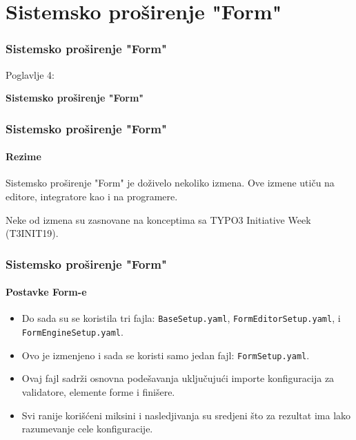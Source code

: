 %

\section{Sistemsko proširenje "Form"}
\begin{frame}[fragile]
	\frametitle{Sistemsko proširenje "Form"}

	\begin{center}\huge{Poglavlje 4:}\end{center}
	\begin{center}\huge{\color{typo3darkgrey}\textbf{Sistemsko proširenje "Form"}}\end{center}

\end{frame}


\begin{frame}[fragile]
	\frametitle{Sistemsko proširenje "Form"}
	\framesubtitle{Rezime}

	\small
		Sistemsko proširenje "Form" je doživelo nekoliko izmena.
		Ove izmene utiču na editore, integratore kao i na programere.

		\vspace{0.2cm}

		Neke od izmena su zasnovane na konceptima sa TYPO3 Initiative Week (T3INIT19).

	\normalsize

\end{frame}


\begin{frame}[fragile]
	\frametitle{Sistemsko proširenje "Form"}
	\framesubtitle{Postavke Form-e}

	\begin{itemize}
		\item Do sada su se koristila tri fajla: \texttt{BaseSetup.yaml}, \texttt{FormEditorSetup.yaml}, i \texttt{FormEngineSetup.yaml}.
		\item Ovo je izmenjeno i sada se koristi samo jedan fajl: \texttt{FormSetup.yaml}.
		\item Ovaj fajl sadrži osnovna podešavanja uključujući importe konfiguracija za validatore, elemente forme i finišere.
		\item Svi ranije korišćeni miksini i nasledjivanja su sredjeni što za rezultat ima
			lako razumevanje cele konfiguracije.
	\end{itemize}

\end{frame}

